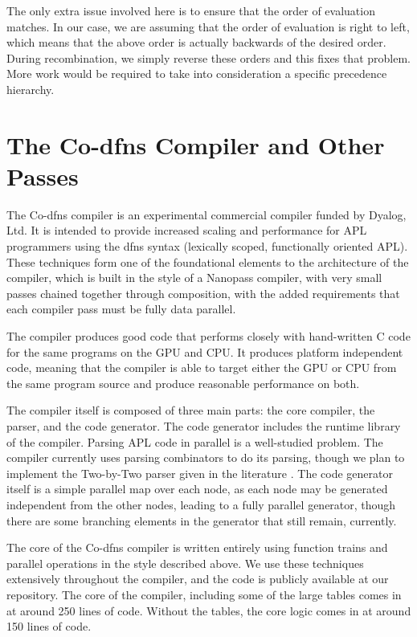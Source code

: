 \documentclass[numbers,9pt]{sigplanconf}
\begin{document}
The only extra issue involved here is to ensure that the order of
evaluation matches. In our case, we are assuming that the order of
evaluation is right to left, which means that the above order is
actually backwards of the desired order. During recombination, we
simply reverse these orders and this fixes that problem. More work
would be required to take into consideration a specific precedence
hierarchy.

\section{The Co-dfns Compiler and Other Passes}

The Co-dfns compiler is an experimental commercial compiler funded by 
Dyalog, Ltd. \cite{hsu2014co,hsu2015accelerating}
It is intended to provide increased scaling and performance
for APL programmers using the dfns syntax (lexically scoped, functionally 
oriented APL). These techniques form one of the foundational elements to 
the architecture of the compiler, which is built in the style of a Nanopass 
\cite{keep2013nanopass}
compiler, with very small passes chained together through composition, with 
the added requirements that each compiler pass must be fully data parallel. 

The compiler produces good code that performs closely with hand-written 
C code for the same programs on the GPU and CPU. It produces platform 
independent code, meaning that the compiler is able to target either the 
GPU or CPU from the same program source and produce reasonable performance 
on both. 

The compiler itself is composed of three main parts: the core compiler, 
the parser, and the code generator. The code generator includes the runtime 
library of the compiler. Parsing APL code in parallel is a well-studied 
problem. The compiler currently uses parsing combinators to do its parsing, 
though we plan to implement the Two-by-Two parser given in the literature
\cite{bunda1984apl}. 
The code generator itself is a simple parallel map over each node, as 
each node may be generated independent from the other nodes, leading to a 
fully parallel generator, though there are some branching elements in the 
generator that still remain, currently. 

The core of the Co-dfns compiler is written entirely using function trains 
and parallel operations in the style described above. We use these techniques 
extensively throughout the compiler, and the code is publicly available 
at our repository. The core of the compiler, including some of the large 
tables comes in at around 250 lines of code. Without the tables, the core 
logic comes in at around 150 lines of code. 
\end{document}
